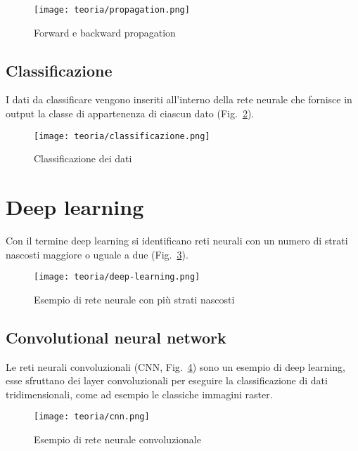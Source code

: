 \begin{figure}[!h] 
    \centering 
    \texttt{[image: teoria/propagation.png]} 
    \caption{Forward e backward propagation}
    \label{fig:propagation}
  \end{figure}


\subsection{Classificazione}
I dati da classificare vengono inseriti all'interno della rete neurale che fornisce in output la classe di appartenenza di ciascun dato (Fig.~\ref{fig:classificazione}).

\begin{figure}[!h] 
    \centering 
    \texttt{[image: teoria/classificazione.png]} 
    \caption{Classificazione dei dati}
    \label{fig:classificazione}
  \end{figure}

\newpage

\section{Deep learning}
Con il termine deep learning si identificano reti neurali con un numero di strati nascosti maggiore o uguale a due (Fig.~\ref{fig:deep-learning}).

\begin{figure}[!h] 
    \centering 
    \texttt{[image: teoria/deep-learning.png]} 
    \caption{Esempio di rete neurale con più strati nascosti}
    \label{fig:deep-learning}
  \end{figure}

\subsection{Convolutional neural network}
Le reti neurali convoluzionali (CNN, Fig.~\ref{fig:cnn}) sono un esempio di deep learning, esse sfruttano dei layer convoluzionali per eseguire la classificazione di dati tridimensionali, come ad esempio le classiche immagini raster.

\begin{figure}[!h] 
    \centering 
    \texttt{[image: teoria/cnn.png]} 
    \caption{Esempio di rete neurale convoluzionale}
    \label{fig:cnn}
  \end{figure}

\newpage

